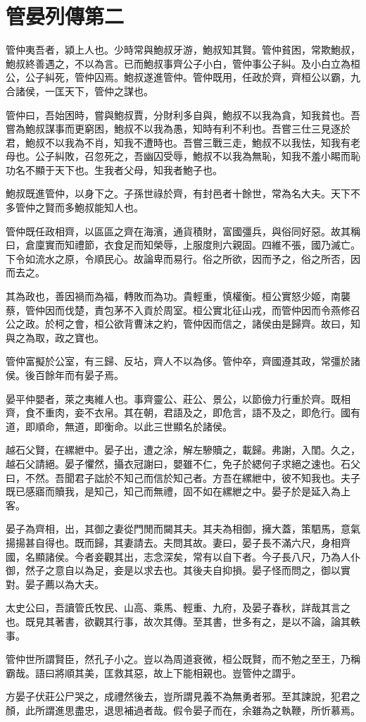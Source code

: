 \chapter{管晏列傳第二}

管仲夷吾者，潁上人也。少時常與鮑叔牙游，鮑叔知其賢。管仲貧困，常欺鮑叔，鮑叔終善遇之，不以為言。已而鮑叔事齊公子小白，管仲事公子糾。及小白立為桓公，公子糾死，管仲囚焉。鮑叔遂進管仲。管仲既用，任政於齊，齊桓公以霸，九合諸侯，一匡天下，管仲之謀也。

管仲曰，吾始困時，嘗與鮑叔賈，分財利多自與，鮑叔不以我為貪，知我貧也。吾嘗為鮑叔謀事而更窮困，鮑叔不以我為愚，知時有利不利也。吾嘗三仕三見逐於君，鮑叔不以我為不肖，知我不遭時也。吾嘗三戰三走，鮑叔不以我怯，知我有老母也。公子糾敗，召忽死之，吾幽囚受辱，鮑叔不以我為無恥，知我不羞小睗而恥功名不顯于天下也。生我者父母，知我者鮑子也。

鮑叔既進管仲，以身下之。子孫世祿於齊，有封邑者十餘世，常為名大夫。天下不多管仲之賢而多鮑叔能知人也。

管仲既任政相齊，以區區之齊在海濱，通貨積財，富國彊兵，與俗同好惡。故其稱曰，倉廩實而知禮節，衣食足而知榮辱，上服度則六親固。四維不張，國乃滅亡。下令如流水之原，令順民心。故論卑而易行。俗之所欲，因而予之，俗之所否，因而去之。

其為政也，善因禍而為福，轉敗而為功。貴輕重，慎權衡。桓公實怒少姬，南襲蔡，管仲因而伐楚，責包茅不入貢於周室。桓公實北征山戎，而管仲因而令燕修召公之政。於柯之會，桓公欲背曹沫之約，管仲因而信之，諸侯由是歸齊。故曰，知與之為取，政之寶也。

管仲富擬於公室，有三歸、反坫，齊人不以為侈。管仲卒，齊國遵其政，常彊於諸侯。後百餘年而有晏子焉。

晏平仲嬰者，萊之夷維人也。事齊靈公、莊公、景公，以節儉力行重於齊。既相齊，食不重肉，妾不衣帛。其在朝，君語及之，即危言，語不及之，即危行。國有道，即順命，無道，即衡命。以此三世顯名於諸侯。

越石父賢，在縲紲中。晏子出，遭之涂，解左驂贖之，載歸。弗謝，入閨。久之，越石父請絕。晏子懼然，攝衣冠謝曰，嬰雖不仁，免子於緦何子求絕之速也。石父曰，不然。吾聞君子詘於不知己而信於知己者。方吾在縲紲中，彼不知我也。夫子既已感寤而贖我，是知己，知己而無禮，固不如在縲紲之中。晏子於是延入為上客。

晏子為齊相，出，其御之妻從門閒而闚其夫。其夫為相御，擁大蓋，策駟馬，意氣揚揚甚自得也。既而歸，其妻請去。夫問其故。妻曰，晏子長不滿六尺，身相齊國，名顯諸侯。今者妾觀其出，志念深矣，常有以自下者。今子長八尺，乃為人仆御，然子之意自以為足，妾是以求去也。其後夫自抑損。晏子怪而問之，御以實對。晏子薦以為大夫。

太史公曰，吾讀管氏牧民、山高、乘馬、輕重、九府，及晏子春秋，詳哉其言之也。既見其著書，欲觀其行事，故次其傳。至其書，世多有之，是以不論，論其軼事。

管仲世所謂賢臣，然孔子小之。豈以為周道衰微，桓公既賢，而不勉之至王，乃稱霸哉。語曰將順其美，匡救其惡，故上下能相親也。豈管仲之謂乎。

方晏子伏莊公尸哭之，成禮然後去，豈所謂見義不為無勇者邪。至其諫說，犯君之顏，此所謂進思盡忠，退思補過者哉。假令晏子而在，余雖為之執鞭，所忻慕焉。